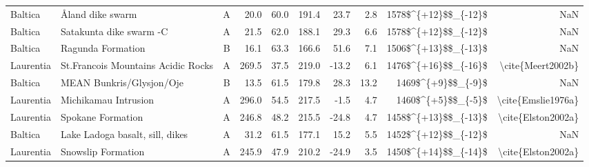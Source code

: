 \begin{longtable}{p{1 in}p{1 in}rrrrrrrr}
                       Baltica &                                   Åland dike swarm &      A &      20.0 &      60.0 & 191.4 &  23.7 &       2.8 &   1578\$\textasciicircum \{+12\}\$\$\_\{-12\}\$ &                                                NaN \\
                       Baltica &                            Satakunta dike swarm -C &      A &      21.5 &      62.0 & 188.1 &  29.3 &       6.6 &   1578\$\textasciicircum \{+12\}\$\$\_\{-12\}\$ &                                                NaN \\
                       Baltica &                                  Ragunda Formation &      B &      16.1 &      63.3 & 166.6 &  51.6 &       7.1 &   1506\$\textasciicircum \{+13\}\$\$\_\{-13\}\$ &                                                NaN \\
                     Laurentia &                 St.Francois Mountains Acidic Rocks &      A &     269.5 &      37.5 & 219.0 & -13.2 &       6.1 &   1476\$\textasciicircum \{+16\}\$\$\_\{-16\}\$ &                                  \textbackslash cite\{Meert2002b\} \\
                       Baltica &                           MEAN Bunkris/Glysjon/Oje &      B &      13.5 &      61.5 & 179.8 &  28.3 &      13.2 &     1469\$\textasciicircum \{+9\}\$\$\_\{-9\}\$ &                                                NaN \\
                     Laurentia &                               Michikamau Intrusion &      A &     296.0 &      54.5 & 217.5 &  -1.5 &       4.7 &     1460\$\textasciicircum \{+5\}\$\$\_\{-5\}\$ &                                 \textbackslash cite\{Emslie1976a\} \\
                     Laurentia &                                  Spokane Formation &      A &     246.8 &      48.2 & 215.5 & -24.8 &       4.7 &   1458\$\textasciicircum \{+13\}\$\$\_\{-13\}\$ &                                 \textbackslash cite\{Elston2002a\} \\
                       Baltica &                    Lake Ladoga basalt, sill, dikes &      A &      31.2 &      61.5 & 177.1 &  15.2 &       5.5 &   1452\$\textasciicircum \{+12\}\$\$\_\{-12\}\$ &                                                NaN \\
                     Laurentia &                                 Snowslip Formation &      A &     245.9 &      47.9 & 210.2 & -24.9 &       3.5 &   1450\$\textasciicircum \{+14\}\$\$\_\{-14\}\$ &                                 \textbackslash cite\{Elston2002a\} \\

\end{longtable}
